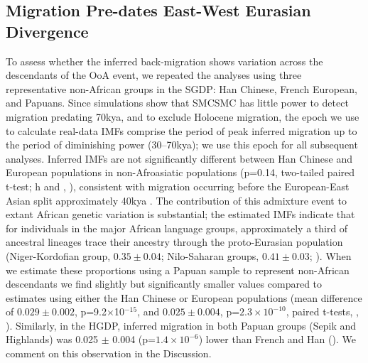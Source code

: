 \subsection{Migration Pre-dates East-West Eurasian Divergence}

To assess whether the inferred back-migration shows variation across the descendants of the OoA event, we repeated the analyses using three representative non-African groups in the SGDP: Han Chinese, French European, and Papuans.  Since simulations show that SMCSMC has little power to detect migration predating 70kya, and to exclude Holocene migration, the epoch we use to calculate real-data IMFs comprise the period of peak inferred migration up to the period of diminishing power (30--70kya); we use this epoch for all subsequent analyses. Inferred IMFs are not significantly different between Han Chinese and European populations in non-Afroasiatic populations (p=0.14, two-tailed paired t-test; h and , ), consistent with migration occurring before the European-East Asian split approximately 40kya \cite{Mathieson2014}.  The contribution of this admixture event to extant African genetic variation is substantial; the estimated IMFs indicate that for individuals in the major African language groups, approximately a third of ancestral lineages trace their ancestry through the proto-Eurasian population (Niger-Kordofian group, $0.35\pm 0.04$; Nilo-Saharan groups, $0.41\pm 0.03$; ). When we estimate these proportions using a Papuan sample to represent non-African descendants we find slightly but significantly smaller values compared to estimates using either the Han Chinese or European populations (mean difference of $0.029 \pm 0.002$, p=9.2$\times$10$^{-15}$, and $0.025 \pm 0.004$, p=$2.3\times 10^{-10}$, paired t-tests, , ). Similarly, in the HGDP, inferred migration in both Papuan groups (Sepik and Highlands) was 0.025 $\pm$ 0.004 (p=$1.4\times10^{-6}$) lower than French and Han ().  We comment on this observation in the Discussion. 




